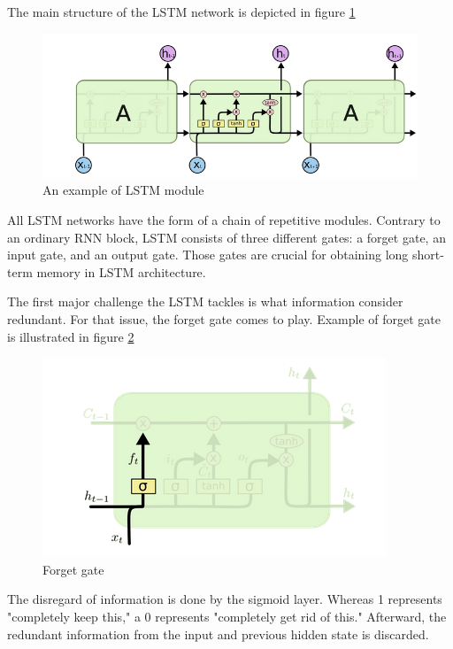 \documentclass[11pt]{article}
\begin{document}
The main structure of the LSTM network is depicted in figure \ref{fig:LSTModule}

\begin{figure}[h]
    \centering
    \includegraphics[width=\columnwidth]{img/LSTM.png}
    \caption{An example of LSTM module} 
    \label{fig:LSTModule}
\end{figure}

All LSTM networks have the form of a chain of repetitive modules. Contrary to an ordinary RNN block, LSTM consists of three different gates: a forget gate, an input gate, and an output gate. Those gates are crucial for obtaining long short-term memory in LSTM architecture. 


The first major challenge the LSTM tackles is what information consider redundant. For that issue, the forget gate comes to play. Example of forget gate is illustrated in figure \ref{fig:forgetGate}

\begin{figure}[h]
    \centering
    \includegraphics[width=\columnwidth]{img/ForgetGate.png}
    \caption{Forget gate} 
    \label{fig:forgetGate}
\end{figure}

The disregard of information is done by the sigmoid layer. Whereas 1 represents "completely keep this," a 0 represents "completely get rid of this." Afterward, the redundant information from the input and previous hidden state is discarded. 
\end{document}
